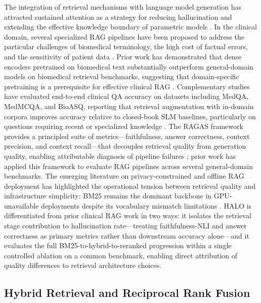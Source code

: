 \documentclass{article}
\begin{document}
The integration of retrieval mechanisms with language model generation has attracted sustained attention as a strategy for reducing hallucination and extending the effective knowledge boundary of parametric models \cite{lewis2020retrieval,singhal2023large}. In the clinical domain, several specialized RAG pipelines have been proposed to address the particular challenges of biomedical terminology, the high cost of factual errors, and the sensitivity of patient data \cite{feuerriegel2023generative}. Prior work has demonstrated that dense encoders pretrained on biomedical text substantially outperform general-domain models on biomedical retrieval benchmarks, suggesting that domain-specific pretraining is a prerequisite for effective clinical RAG \cite{labrak2024biomistral}. Complementary studies have evaluated end-to-end clinical QA accuracy on datasets including MedQA, MedMCQA, and BioASQ, reporting that retrieval augmentation with in-domain corpora improves accuracy relative to closed-book SLM baselines, particularly on questions requiring recent or specialized knowledge \cite{singhal2023large}. The RAGAS framework provides a principled suite of metrics---faithfulness, answer correctness, context precision, and context recall---that decouples retrieval quality from generation quality, enabling attributable diagnosis of pipeline failures \cite{es2023ragas}; prior work has applied this framework to evaluate RAG pipelines across several general-domain benchmarks. The emerging literature on privacy-constrained and offline RAG deployment has highlighted the operational tension between retrieval quality and infrastructure simplicity: BM25 remains the dominant backbone in GPU-unavailable deployments despite its vocabulary mismatch limitations \cite{robertson2009probabilistic}. HALO is differentiated from prior clinical RAG work in two ways: it isolates the retrieval stage contribution to hallucination rate---treating faithfulness-NLI and answer correctness as primary metrics rather than downstream accuracy alone---and it evaluates the full BM25-to-hybrid-to-reranked progression within a single controlled ablation on a common benchmark, enabling direct attribution of quality differences to retrieval architecture choices.

\subsection{Hybrid Retrieval and Reciprocal Rank Fusion}

\label{sec:hybrid_retrieval_and_reciprocal_rank_fus}
\end{document}
